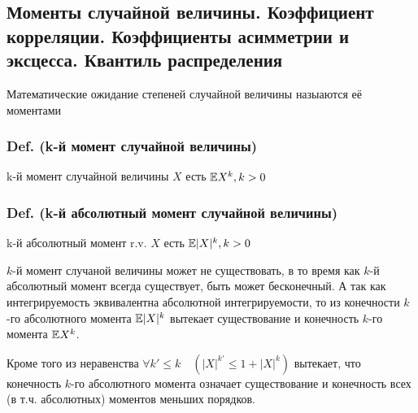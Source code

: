 \subsection{Моменты случайной величины. Коэффициент корреляции.
Коэффициенты асимметрии и эксцесса. Квантиль
распределения}\label{ux43cux43eux43cux435ux43dux442ux44b-ux441ux43bux443ux447ux430ux439ux43dux43eux439-ux432ux435ux43bux438ux447ux438ux43dux44b.-ux43aux43eux44dux444ux444ux438ux446ux438ux435ux43dux442-ux43aux43eux440ux440ux435ux43bux44fux446ux438ux438.-ux43aux43eux44dux444ux444ux438ux446ux438ux435ux43dux442ux44b-ux430ux441ux438ux43cux43cux435ux442ux440ux438ux438-ux438-ux44dux43aux441ux446ux435ux441ux441ux430.-ux43aux432ux430ux43dux442ux438ux43bux44c-ux440ux430ux441ux43fux440ux435ux434ux435ux43bux435ux43dux438ux44f}

Математические ожидание степеней случайной величины назыаются её
моментами

\subsubsection{Def. (k-й момент случайной
величины)}\label{def.-k-ux439-ux43cux43eux43cux435ux43dux442-ux441ux43bux443ux447ux430ux439ux43dux43eux439-ux432ux435ux43bux438ux447ux438ux43dux44b}

k-й момент случайной величины \(X\) есть \(\mathbb E X^k, k>0\)

\subsubsection{Def. (k-й абсолютный момент случайной
величины)}\label{def.-k-ux439-ux430ux431ux441ux43eux43bux44eux442ux43dux44bux439-ux43cux43eux43cux435ux43dux442-ux441ux43bux443ux447ux430ux439ux43dux43eux439-ux432ux435ux43bux438ux447ux438ux43dux44b}

k-й абсолютный момент r.v. \(X\) есть \(\mathbb E |X|^k, k>0\)

\(k\)-й момент случаной величины может не существовать, в то время как
\(k\)-й абсолютный момент всегда существует, быть может бесконечный. А
так как интегрируемость эквивалентна абсолютной интегрируемости, то из
конечности \(k\)-го абсолютного момента \(\mathbb E |X|^k\) вытекает
существование и конечность \(k\)-го момента \(\mathbb E X^k\).

Кроме того из неравенства
\(\forall k\prime\leq k \quad ( |X|^{k\prime} \leq 1 + |X|^k )\)
вытекает, что конечность \(k\)-го абсолютного момента означает
существование и конечность всех (в т.ч. абсолютных) моментов меньших
порядков.


